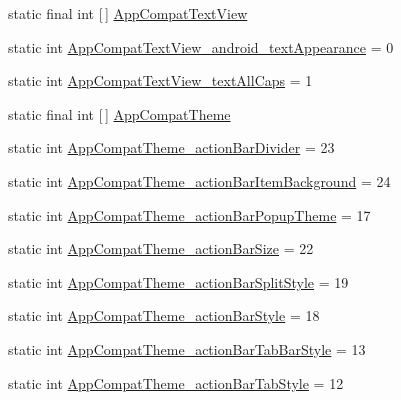 \begin{DoxyCompactItemize}
\item 
static final int \mbox{[}$\,$\mbox{]} \hyperlink{classandroid_1_1support_1_1v7_1_1cardview_1_1R_1_1styleable_af61bc97363f0e3c84c9e3784694f0888}{App\+Compat\+Text\+View}
\item 
static int \hyperlink{classandroid_1_1support_1_1v7_1_1cardview_1_1R_1_1styleable_ad2f86d9e5df52c4a7da3243d5c2db455}{App\+Compat\+Text\+View\+\_\+android\+\_\+text\+Appearance} = 0
\item 
static int \hyperlink{classandroid_1_1support_1_1v7_1_1cardview_1_1R_1_1styleable_a933d95eb55173c60b189dd6ed21b2d3a}{App\+Compat\+Text\+View\+\_\+text\+All\+Caps} = 1
\item 
static final int \mbox{[}$\,$\mbox{]} \hyperlink{classandroid_1_1support_1_1v7_1_1cardview_1_1R_1_1styleable_a52e6f69f954ecc2622d72c0b4d298938}{App\+Compat\+Theme}
\item 
static int \hyperlink{classandroid_1_1support_1_1v7_1_1cardview_1_1R_1_1styleable_ac34be2954e08817451f01ab1463f255e}{App\+Compat\+Theme\+\_\+action\+Bar\+Divider} = 23
\item 
static int \hyperlink{classandroid_1_1support_1_1v7_1_1cardview_1_1R_1_1styleable_a7d5d06ba7d63aa6454a9674a766d055f}{App\+Compat\+Theme\+\_\+action\+Bar\+Item\+Background} = 24
\item 
static int \hyperlink{classandroid_1_1support_1_1v7_1_1cardview_1_1R_1_1styleable_a3963e0347226bf61f80567cb825e8ee2}{App\+Compat\+Theme\+\_\+action\+Bar\+Popup\+Theme} = 17
\item 
static int \hyperlink{classandroid_1_1support_1_1v7_1_1cardview_1_1R_1_1styleable_af90bee6c34b66aba2ac6c560cab1a628}{App\+Compat\+Theme\+\_\+action\+Bar\+Size} = 22
\item 
static int \hyperlink{classandroid_1_1support_1_1v7_1_1cardview_1_1R_1_1styleable_ab8a026b209f8ec93d6972d986e7780ae}{App\+Compat\+Theme\+\_\+action\+Bar\+Split\+Style} = 19
\item 
static int \hyperlink{classandroid_1_1support_1_1v7_1_1cardview_1_1R_1_1styleable_a6ee7326e5eb8f855d6bb21269c3cd5c4}{App\+Compat\+Theme\+\_\+action\+Bar\+Style} = 18
\item 
static int \hyperlink{classandroid_1_1support_1_1v7_1_1cardview_1_1R_1_1styleable_a62fc2bc35ec89e449e1937f9d5f64823}{App\+Compat\+Theme\+\_\+action\+Bar\+Tab\+Bar\+Style} = 13
\item 
static int \hyperlink{classandroid_1_1support_1_1v7_1_1cardview_1_1R_1_1styleable_a05482cda1e27909ff5d3f7e056408426}{App\+Compat\+Theme\+\_\+action\+Bar\+Tab\+Style} = 12

\end{DoxyCompactItemize}
